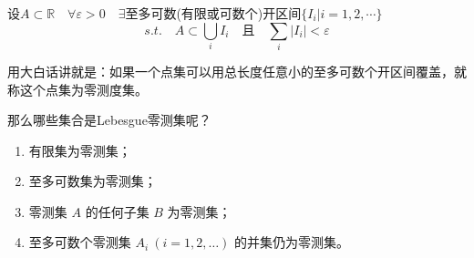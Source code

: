 \documentclass[lang=cn,12pt]{elegantbook}
\begin{document}
\begin{definition}
    设$A \subset \mathbb{R} \quad \forall \varepsilon >0 \quad \exists $至多可数(有限或可数个)开区间$\{I_i|i = 1,2,\cdots\}$
    \[
    s.t. \quad A \subset  \bigcup_i I_i \quad \text{且} \quad \sum_i|I_i| < \varepsilon
    \]
\end{definition}
用大白话讲就是：如果一个点集可以用总长度任意小的至多可数个开区间覆盖，就称这个点集为零测度集。

那么哪些集合是Lebesgue零测集呢？
\begin{lemma}
    \begin{enumerate}
        \item[(1)] 有限集为零测集；
        \item[(2)] 至多可数集为零测集；
        \item[(3)] 零测集 \( A \) 的任何子集 \( B \) 为零测集；
        \item[(4)] 至多可数个零测集 \( A_i \ (i = 1, 2, \dots) \) 的并集仍为零测集。
    \end{enumerate}
\end{lemma}
\end{document}

